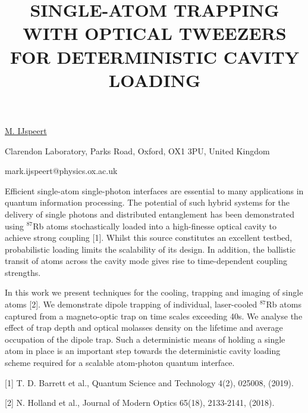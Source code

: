 \title{SINGLE-ATOM TRAPPING WITH OPTICAL TWEEZERS FOR DETERMINISTIC CAVITY LOADING}

\underline{M. IJspeert}  

{\normalsize{\vspace{-4mm}
Clarendon Laboratory,
Parks Road,
Oxford,
OX1 3PU,
United Kingdom



\email mark.ijspeert@physics.ox.ac.uk}}

Efficient single-atom single-photon interfaces are essential to many applications in quantum information processing. The potential of such hybrid systems for the delivery of single photons and distributed entanglement has been demonstrated using $^{87}$Rb atoms stochastically loaded into a high-finesse optical cavity to achieve strong coupling [1]. Whilst this source constitutes an excellent testbed, probabilistic loading limits the scalability of its design. In addition, the ballistic transit of atoms across the cavity mode gives rise to time-dependent coupling strengths.

In this work we present techniques for the cooling, trapping and imaging of single atoms [2]. We demonstrate dipole trapping of individual, laser-cooled $^{87}$Rb atoms captured from a magneto-optic trap on time scales exceeding 40s. We analyse the effect of trap depth and optical molasses density on the lifetime and average occupation of the dipole trap. Such a deterministic means of holding a single atom in place is an important step towards the deterministic cavity loading scheme required for a scalable atom-photon quantum interface.

{\normalsize
[1] T. D. Barrett et al., Quantum Science and Technology 4(2), 025008, (2019).
\vsp

[2] N. Holland et al., Journal of Modern Optics 65(18), 2133-2141, (2018).
}

\vspace{\baselineskip}
